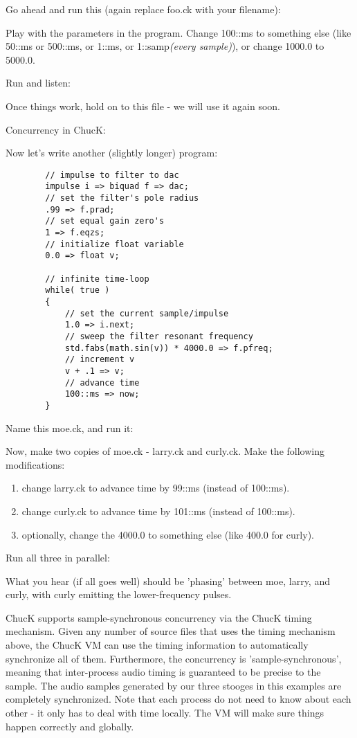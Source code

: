 Go ahead and run this (again replace foo.ck with your filename):

Play with the parameters in the program. Change 100::ms to something else (like 50::ms or 500::ms, or 1::ms, or 1::samp\textit{(every sample)}), or change 1000.0 to 5000.0. 

Run and listen:

Once things work, hold on to this file - we will use it again soon. 

Concurrency in ChucK: 

Now let's write another (slightly longer) program:
\begin{verbatim}
        // impulse to filter to dac
        impulse i => biquad f => dac;
        // set the filter's pole radius
        .99 => f.prad;
        // set equal gain zero's
        1 => f.eqzs;
        // initialize float variable
        0.0 => float v;

        // infinite time-loop
        while( true )
        {
            // set the current sample/impulse
            1.0 => i.next;
            // sweep the filter resonant frequency
            std.fabs(math.sin(v)) * 4000.0 => f.pfreq;
            // increment v
            v + .1 => v;
            // advance time
            100::ms => now;
        }
\end{verbatim}

Name this moe.ck, and run it:

Now, make two copies of moe.ck - larry.ck and curly.ck. Make the following modifications:
\begin{enumerate}
\item change larry.ck to advance time by 99::ms (instead of 100::ms).
\item change curly.ck to advance time by 101::ms (instead of 100::ms). 
\item optionally, change the 4000.0 to something else (like 400.0 for curly). 
\end{enumerate}

Run all three in parallel:

What you hear (if all goes well) should be 'phasing' between moe, larry, and curly, 
with curly emitting the lower-frequency pulses. 

ChucK supports sample-synchronous concurrency via the ChucK timing mechanism. Given any 
number of source files that uses the timing mechanism above, the ChucK VM can use the timing 
information to automatically synchronize all of them. Furthermore, the concurrency is 
'sample-synchronous', meaning that inter-process audio timing is guaranteed to be precise to 
the sample. The audio samples generated by our three stooges in this examples are completely 
synchronized. Note that each process do not need to know about each other - it only has to deal 
with time locally. The VM will make sure things happen correctly and globally. 
